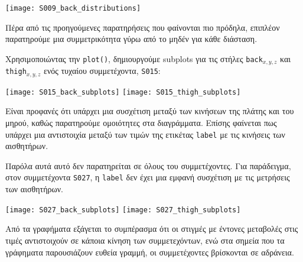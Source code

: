             \begin{center}
            \texttt{[image: S009\_back\_distributions]}
        \end{center}


        Πέρα από τις προηγούμενες παρατηρήσεις που φαίνονται πιο πρόδηλα, επιπλέον παρατηρούμε μια συμμετρικότητα γύρω από το μηδέν
        για κάθε διάσταση.

        Χρησιμοποιώντας την \texttt{plot()}, δημιουργούμε subplots για τις στήλες \texttt{back}\(_{x,y,z}\)
        και \texttt{thigh}\(_{x,y,z}\) ενός τυχαίου συμμετέχοντα, \texttt{S015}:

        \begin{multicols}{2} \centering
            \noindent\texttt{[image: S015\_back\_subplots]}
            \texttt{[image: S015\_thigh\_subplots]}
        \end{multicols}

        Είναι προφανές ότι υπάρχει μια συσχέτιση μεταξύ των κινήσεων της πλάτης και του μηρού, καθώς παρατηρούμε ομοιότητες στα διαγράμματα.
        Επίσης φαίνεται πως υπάρχει μια αντιστοιχία μεταξύ των τιμών της ετικέτας \texttt{label} με τις κινήσεις των αισθητήρων.

        Παρόλα αυτά αυτό δεν παρατηρείται σε όλους του συμμετέχοντες. Για παράδειγμα, στον συμμετέχοντα \texttt{S027},
        η \texttt{label} δεν έχει μια εμφανή συσχέτιση με τις μετρήσεις των αισθητήρων.

        \begin{multicols}{2} \centering
            \noindent\texttt{[image: S027\_back\_subplots]}
            \texttt{[image: S027\_thigh\_subplots]}
        \end{multicols}

        Από τα γραφήματα εξάγεται το συμπέρασμα ότι οι στιγμές με έντονες μεταβολές στις τιμές αντιστοιχούν σε κάποια κίνηση των συμμετεχόντων,
        ενώ στα σημεία που τα γράφηματα παρουσιάζουν ευθεία γραμμή, οι συμμετέχοντες βρίσκονται σε αδράνεια.

